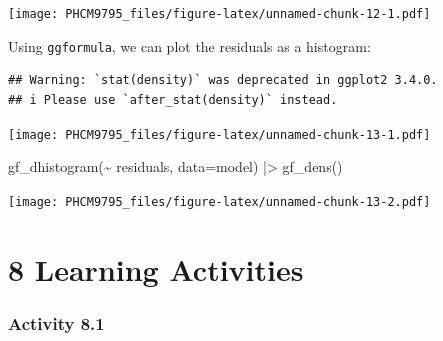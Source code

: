 \documentclass[
]{memoir}
\newenvironment{Shaded}{\begin{snugshade}}{\end{snugshade}}
\newcommand{\AttributeTok}[1]{\textcolor[rgb]{0.77,0.63,0.00}{#1}}
\newcommand{\FunctionTok}[1]{\textcolor[rgb]{0.00,0.00,0.00}{#1}}
\newcommand{\NormalTok}[1]{#1}
\newcommand{\SpecialCharTok}[1]{\textcolor[rgb]{0.00,0.00,0.00}{#1}}
\newcommand{\StringTok}[1]{\textcolor[rgb]{0.31,0.60,0.02}{#1}}
\begin{document}
\texttt{[image: PHCM9795\_files/figure-latex/unnamed-chunk-12-1.pdf]}

Using \texttt{ggformula}, we can plot the residuals as a histogram:

\begin{Shaded}
\end{Shaded}

\begin{verbatim}
## Warning: `stat(density)` was deprecated in ggplot2 3.4.0.
## i Please use `after_stat(density)` instead.
\end{verbatim}

\texttt{[image: PHCM9795\_files/figure-latex/unnamed-chunk-13-1.pdf]}

\begin{Shaded}
\begin{Highlighting}[]
\FunctionTok{gf\_dhistogram}\NormalTok{(}\SpecialCharTok{\textasciitilde{}}\NormalTok{ residuals, }\AttributeTok{data=}\NormalTok{model) }\SpecialCharTok{|\textgreater{}}
  \FunctionTok{gf\_dens}\NormalTok{()}
\end{Highlighting}
\end{Shaded}

\texttt{[image: PHCM9795\_files/figure-latex/unnamed-chunk-13-2.pdf]}

\hypertarget{learning-activities}{%
\chapter*{\texorpdfstring{\textbf{8} Learning Activities}{8 Learning Activities}}\label{learning-activities}}

\hypertarget{activity-8.1}{%
\subsection*{Activity 8.1}\label{activity-8.1}}
\end{document}

